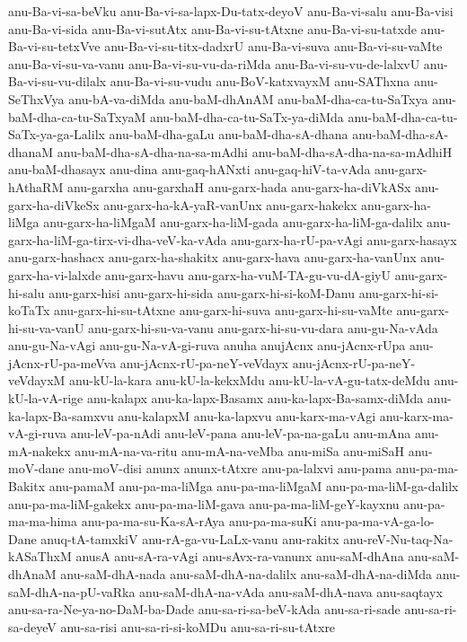 {anu-Ba-vi-sa-beVku
anu-Ba-vi-sa-lapx-Du-tatx-deyoV
anu-Ba-vi-salu
anu-Ba-visi
anu-Ba-vi-sida
anu-Ba-vi-sutAtx
anu-Ba-vi-su-tAtxne
anu-Ba-vi-su-tatxde
anu-Ba-vi-su-tetxVve
anu-Ba-vi-su-titx-dadxrU
anu-Ba-vi-suva
anu-Ba-vi-su-vaMte
anu-Ba-vi-su-va-vanu
anu-Ba-vi-su-vu-da-riMda
anu-Ba-vi-su-vu-de-lalxvU
anu-Ba-vi-su-vu-dilalx
anu-Ba-vi-su-vudu
anu-BoV-katxvayxM
anu-SAThxna
anu-SeThxVya
anu-bA-va-diMda
anu-baM-dhAnAM
anu-baM-dha-ca-tu-SaTxya
anu-baM-dha-ca-tu-SaTxyaM
anu-baM-dha-ca-tu-SaTx-ya-diMda
anu-baM-dha-ca-tu-SaTx-ya-ga-Lalilx
anu-baM-dha-gaLu
anu-baM-dha-sA-dhana
anu-baM-dha-sA-dhanaM
anu-baM-dha-sA-dha-na-sa-mAdhi
anu-baM-dha-sA-dha-na-sa-mAdhiH
anu-baM-dhasayx
anu-dina
anu-gaq-hANxti
anu-gaq-hiV-ta-vAda
anu-garx-hAthaRM
anu-garxha
anu-garxhaH
anu-garx-hada
anu-garx-ha-diVkASx
anu-garx-ha-diVkeSx
anu-garx-ha-kA-yaR-vanUnx
anu-garx-hakekx
anu-garx-ha-liMga
anu-garx-ha-liMgaM
anu-garx-ha-liM-gada
anu-garx-ha-liM-ga-dalilx
anu-garx-ha-liM-ga-tirx-vi-dha-veV-ka-vAda
anu-garx-ha-rU-pa-vAgi
anu-garx-hasayx
anu-garx-hashacx
anu-garx-ha-shakitx
anu-garx-hava
anu-garx-ha-vanUnx
anu-garx-ha-vi-lalxde
anu-garx-havu
anu-garx-ha-vuM-TA-gu-vu-dA-giyU
anu-garx-hi-salu
anu-garx-hisi
anu-garx-hi-sida
anu-garx-hi-si-koM-Danu
anu-garx-hi-si-koTaTx
anu-garx-hi-su-tAtxne
anu-garx-hi-suva
anu-garx-hi-su-vaMte
anu-garx-hi-su-va-vanU
anu-garx-hi-su-va-vanu
anu-garx-hi-su-vu-dara
anu-gu-Na-vAda
anu-gu-Na-vAgi
anu-gu-Na-vA-gi-ruva
anuha
anujAcnx
anu-jAcnx-rUpa
anu-jAcnx-rU-pa-meVva
anu-jAcnx-rU-pa-neY-veVdayx
anu-jAcnx-rU-pa-neY-veVdayxM
anu-kU-la-kara
anu-kU-la-kekxMdu
anu-kU-la-vA-gu-tatx-deMdu
anu-kU-la-vA-rige
anu-kalapx
anu-ka-lapx-Basamx
anu-ka-lapx-Ba-samx-diMda
anu-ka-lapx-Ba-samxvu
anu-kalapxM
anu-ka-lapxvu
anu-karx-ma-vAgi
anu-karx-ma-vA-gi-ruva
anu-leV-pa-nAdi
anu-leV-pana
anu-leV-pa-na-gaLu
anu-mAna
anu-mA-nakekx
anu-mA-na-va-ritu
anu-mA-na-veMba
anu-miSa
anu-miSaH
anu-moV-dane
anu-moV-disi
anunx
anunx-tAtxre
anu-pa-lalxvi
anu-pama
anu-pa-ma-Bakitx
anu-pamaM
anu-pa-ma-liMga
anu-pa-ma-liMgaM
anu-pa-ma-liM-ga-dalilx
anu-pa-ma-liM-gakekx
anu-pa-ma-liM-gava
anu-pa-ma-liM-geY-kayxnu
anu-pa-ma-ma-hima
anu-pa-ma-su-Ka-sA-rAya
anu-pa-ma-suKi
anu-pa-ma-vA-ga-lo-Dane
anuq-tA-tamxkiV
anu-rA-ga-vu-LaLx-vanu
anu-rakitx
anu-reV-Nu-taq-Na-kASaThxM
anusA
anu-sA-ra-vAgi
anu-sAvx-ra-vanunx
anu-saM-dhAna
anu-saM-dhAnaM
anu-saM-dhA-nada
anu-saM-dhA-na-dalilx
anu-saM-dhA-na-diMda
anu-saM-dhA-na-pU-vaRka
anu-saM-dhA-na-vAda
anu-saM-dhA-nava
anu-saqtayx
anu-sa-ra-Ne-ya-no-DaM-ba-Dade
anu-sa-ri-sa-beV-kAda
anu-sa-ri-sade
anu-sa-ri-sa-deyeV
anu-sa-risi
anu-sa-ri-si-koMDu
anu-sa-ri-su-tAtxre
}
